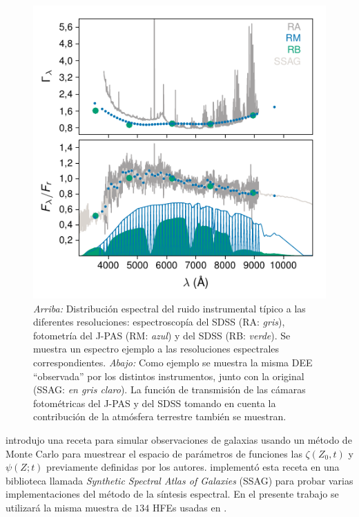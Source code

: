 \begin{figure}
\includegraphics{figures/sigma-spectrum}
%
\caption{\emph{Arriba:} Distribución espectral del ruido instrumental típico a las diferentes
resoluciones: espectroscopía del SDSS (RA: \emph{gris}), fotometría del J-PAS (RM: \emph{azul}) y
del SDSS (RB: \emph{verde}). Se muestra un espectro ejemplo a las resoluciones espectrales
correspondientes. \emph{Abajo:} Como ejemplo se muestra la misma DEE ``observada'' por los distintos
instrumentos, junto con la original (SSAG: \emph{en gris claro}). La función de transmisión de las
cámaras fotométricas del J-PAS y del SDSS tomando en cuenta la contribución de la atmósfera
terrestre también se muestran.}
%
\label{fig:sigma-spectrum}
\end{figure}

\citet{Chen2012} introdujo una receta para simular observaciones de galaxias usando un método de
Monte Carlo para muestrear el espacio de parámetros de funciones las $\zeta(Z_0,t)$ y $\psi(Z;t)$
previamente definidas por los autores. \citet{Magris2015} implementó esta receta en una biblioteca
llamada \emph{Synthetic Spectral Atlas of Galaxies} (SSAG) para probar varias implementaciones del
método de la síntesis espectral. En el presente trabajo se utilizará la misma muestra de $134$ HFEs
usadas en \citet{Magris2015}.


